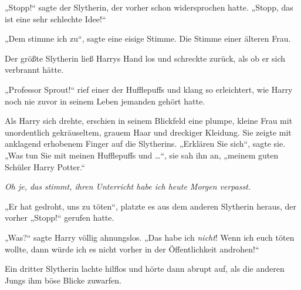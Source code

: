 „Stopp!“ sagte der Slytherin, der vorher schon widersprochen hatte.
„Stopp, das ist eine sehr schlechte Idee!“

„Dem stimme ich zu“, sagte eine eisige Stimme. Die Stimme einer älteren Frau.

Der größte Slytherin ließ Harrys Hand los und schreckte zurück, als ob er sich verbrannt hätte.

„Professor Sprout!“ rief einer der Hufflepuffs und klang so erleichtert, wie Harry noch nie zuvor in seinem Leben jemanden gehört hatte.

Als Harry sich drehte, erschien in seinem Blickfeld eine plumpe, kleine Frau mit unordentlich gekräuseltem, grauem Haar und dreckiger Kleidung. Sie zeigte mit anklagend erhobenem Finger auf die Slytherins.
„Erklären Sie sich“, sagte sie.
„Was tun Sie mit meinen Hufflepuffs und …“, sie sah ihn an, „meinem guten Schüler Harry Potter.“

\emph{Oh je, das stimmt, \emph{ihren} Unterricht habe ich heute Morgen verpasst.}

„Er hat gedroht, uns zu töten“, platzte es aus dem anderen Slytherin heraus, der vorher
„Stopp!“ gerufen hatte.

„Was?“ sagte Harry völlig ahnungslos.
„Das habe ich \emph{nicht}! Wenn ich euch töten wollte, dann würde ich es nicht vorher in der Öffentlichkeit androhen!“

Ein dritter Slytherin lachte hilflos und hörte dann abrupt auf, als die anderen Jungs ihm böse Blicke zuwarfen.

